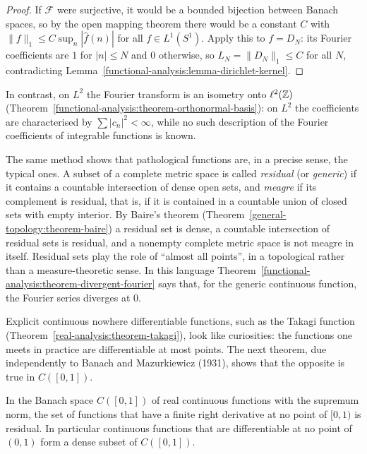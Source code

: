 \begin{proof}
If $\mathcal{F}$ were surjective, it would be a bounded bijection between Banach spaces, so by the open mapping theorem there would be a constant $C$ with $\|f\|_1 \leq C\sup_n|\hat f(n)|$ for all
$f \in L^1(S^1)$. Apply this to $f = D_N$: its Fourier coefficients are $1$ for $|n| \leq N$ and $0$ otherwise, so $L_N = \|D_N\|_1 \leq C$ for all $N$, contradicting
Lemma~\ref{functional-analysis:lemma-dirichlet-kernel}.
\end{proof}

In contrast, on $L^2$ the Fourier transform is an isometry onto $\ell^2(\mathbb{Z})$ (Theorem~\ref{functional-analysis:theorem-orthonormal-basis}): on $L^2$ the coefficients are characterised by
$\sum|c_n|^2 < \infty$, while no such description of the Fourier coefficients of integrable functions is known.

The same method shows that pathological functions are, in a precise sense, the typical ones. A subset of a complete metric space is called \emph{residual} (or \emph{generic}) if it contains a
countable intersection of dense open sets, and \emph{meagre} if its complement is residual, that is, if it is contained in a countable union of closed sets with empty interior. By Baire's theorem
(Theorem~\ref{general-topology:theorem-baire}) a residual set is dense, a countable intersection of residual sets is residual, and a nonempty complete metric space is not meagre in itself. Residual sets
play the role of ``almost all points'', in a topological rather than a measure-theoretic sense. In this language Theorem~\ref{functional-analysis:theorem-divergent-fourier} says that, for the generic
continuous function, the Fourier series diverges at $0$.

Explicit continuous nowhere differentiable functions, such as the Takagi function (Theorem~\ref{real-analysis:theorem-takagi}), look like curiosities: the functions one meets in practice are differentiable at most
points. The next theorem, due independently to Banach and Mazurkiewicz (1931), shows that the opposite is true in $C([0, 1])$.

\begin{theorem}\label{functional-analysis:theorem-nowhere-differentiable}
In the Banach space $C([0, 1])$ of real continuous functions with the supremum norm, the set of functions that have a finite right derivative at no point of $[0, 1)$ is residual. In particular
continuous functions that are differentiable at no point of $(0, 1)$ form a dense subset of $C([0, 1])$.
\end{theorem}

